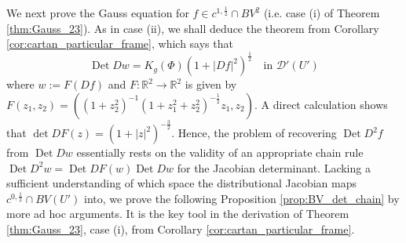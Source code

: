 \documentclass[12pt]{article}
\newcommand{\R}{\mathbb{R}}
\newcommand{\Det}{\operatorname{Det}}
\theoremstyle{plain}
\numberwithin{equation}{section}
\begin{document}
We next prove the Gauss equation for $f \in c^{1,\frac12} \cap BV^2$ (i.e. case (i) of Theorem \ref{thm:Gauss_23}). As in case (ii), we shall deduce the theorem from Corollary \ref{cor:cartan_particular_frame}, which says that
\begin{equation*}
    \Det Dw = K_g(\Phi)(1+|Df|^2)^\frac12 \quad \text{in } \mathcal{D}'(U')
\end{equation*}
where $w := F(Df)$ and $F : \R^2 \to \R^2$ is given by $F(z_1,z_2) = ((1+z_2^2)^{-1}(1+z_1^2+z_2^2)^{-\frac12}z_1,z_2)$. A direct calculation shows that $\det DF(z) = (1+|z|^2)^{-\frac32}$. Hence, the problem of recovering $\Det D^2f$ from $\Det Dw$ essentially rests on the validity of an appropriate chain rule $\Det D^2w = \Det DF(w) \Det Dw$ for the Jacobian determinant. Lacking a sufficient understanding of which space the distributional Jacobian maps $c^{0,\frac12} \cap BV(U')$ into, we prove the following  Proposition \ref{prop:BV_det_chain} by more ad hoc arguments. It is the key tool in the derivation of Theorem \ref{thm:Gauss_23}, case (i), from Corollary \ref{cor:cartan_particular_frame}.
\end{document}
